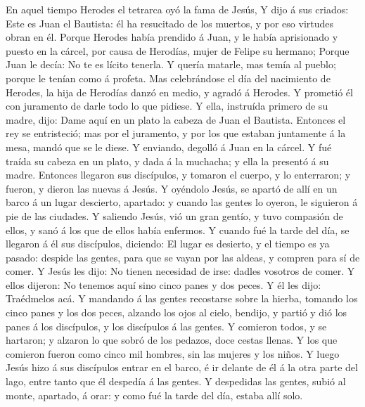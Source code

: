  En aquel tiempo Herodes el tetrarca oyó la fama de Jesús,
 Y dijo á sus criados: Este es Juan el Bautista: él ha
resucitado de los muertos, y por eso virtudes obran en él. 
Porque Herodes había prendido á Juan, y le había aprisionado y puesto en
la cárcel, por causa de Herodías, mujer de Felipe su hermano;
 Porque Juan le decía: No te es lícito tenerla. 
Y quería matarle, mas temía al pueblo; porque le tenían como á profeta.
 Mas celebrándose el día del nacimiento de Herodes, la hija
de Herodías danzó en medio, y agradó á Herodes.  Y prometió
él con juramento de darle todo lo que pidiese.  Y ella,
instruída primero de su madre, dijo: Dame aquí en un plato la cabeza de
Juan el Bautista.  Entonces el rey se entristeció; mas por
el juramento, y por los que estaban juntamente á la mesa, mandó que se
le diese.  Y enviando, degolló á Juan en la cárcel.
 Y fué traída su cabeza en un plato, y dada á la muchacha;
y ella la presentó á su madre.  Entonces llegaron sus
discípulos, y tomaron el cuerpo, y lo enterraron; y fueron, y dieron las
nuevas á Jesús.  Y oyéndolo Jesús, se apartó de allí en un
barco á un lugar descierto, apartado: y cuando las gentes lo oyeron, le
siguieron á pie de las ciudades.  Y saliendo Jesús, vió un
gran gentío, y tuvo compasión de ellos, y sanó á los que de ellos había
enfermos.  Y cuando fué la tarde del día, se llegaron á él
sus discípulos, diciendo: El lugar es desierto, y el tiempo es ya
pasado: despide las gentes, para que se vayan por las aldeas, y compren
para sí de comer.  Y Jesús les dijo: No tienen necesidad de
irse: dadles vosotros de comer.  Y ellos dijeron: No
tenemos aquí sino cinco panes y dos peces.  Y él les dijo:
Traédmelos acá.  Y mandando á las gentes recostarse sobre
la hierba, tomando los cinco panes y los dos peces, alzando los ojos al
cielo, bendijo, y partió y dió los panes á los discípulos, y los
discípulos á las gentes.  Y comieron todos, y se hartaron;
y alzaron lo que sobró de los pedazos, doce cestas llenas. 
Y los que comieron fueron como cinco mil hombres, sin las mujeres y los
niños.  Y luego Jesús hizo á sus discípulos entrar en el
barco, é ir delante de él á la otra parte del lago, entre tanto que él
despedía á las gentes.  Y despedidas las gentes, subió al
monte, apartado, á orar: y como fué la tarde del día, estaba allí solo.
